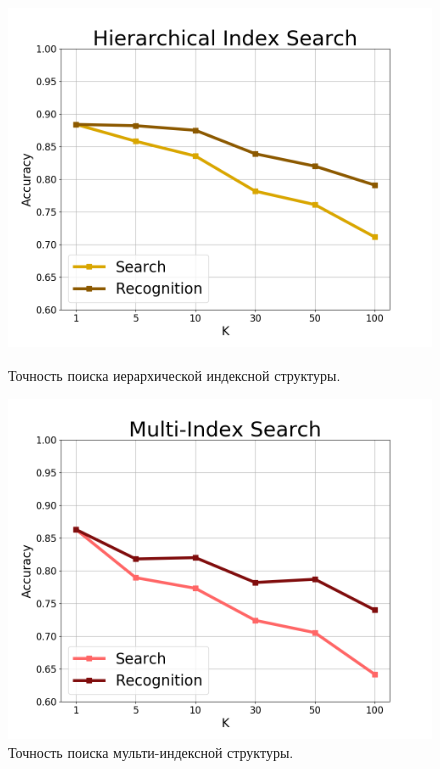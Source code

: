 \begin{figure}[h]
\begin{minipage}[h]{0.49\linewidth}
\includegraphics[width=1\linewidth]{Images/HierarchicalIndexSearch.png}
\caption{Точность поиска иерархической индексной структуры.}
\label{ris:hierarchicalindexsearch}
\end{minipage}
\hfill
\begin{minipage}[h]{0.49\linewidth}
\includegraphics[width=1\linewidth]{Images/MultiIndexSearch.png}
\caption{Точность поиска мульти-индексной структуры.}
\label{ris:multiindexsearch}
\end{minipage}
\end{figure}

